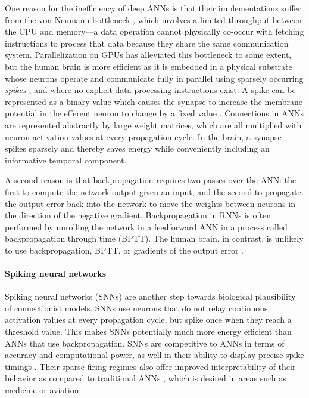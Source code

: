 	One reason for the inefficiency of deep ANNs is that their implementations suffer from the von Neumann bottleneck \citep{zenke2021brain}, which involves a limited throughput between the CPU and memory---a data operation cannot physically co-occur with fetching instructions to process that data because they share the same communication system.
	Parallelization on GPUs has alleviated this bottleneck to some extent, but the human brain is more efficient as it is embedded in a physical substrate whose neurons operate and communicate fully in parallel \citep{a2017parallel} using sparsely occurring \emph{spikes} \citep{bear2020neuroscience}, and where no explicit data processing instructions exist.
	A spike can be represented as a binary value which causes the synapse to increase the membrane potential in the efferent neuron to change by a fixed value \citep{bear2020neuroscience}.
	Connections in ANNs are represented abstractly by large weight matrices, which are all multiplied with neuron activation values at every propagation cycle.
	In the brain, a synapse spikes sparsely and thereby saves energy while conveniently including an informative temporal component.

	A second reason is that backpropagation requires two passes over the ANN: the first to compute the network output given an input, and the second to propagate the output error back into the network to move the weights between neurons in the direction of the negative gradient.
	Backpropagation in RNNs is often performed by unrolling the network in a feedforward ANN in a process called backpropagation through time (BPTT).
	The human brain, in contrast, is unlikely to use backpropagation, BPTT, or gradients of the output error \citep{lillicrap2019backpropagation}.

\paragraph{Spiking neural networks}
	Spiking neural networks (SNNs) \citep{maass1997networks,gerstner2002spiking} are another step towards biological plausibility of connectionist models.
	SNNs use neurons that do not relay continuous activation values at every propagation cycle, but spike once when they reach a threshold value.
	This makes SNNs potentially much more energy efficient than ANNs that use backpropagation.
	SNNs are competitive to ANNs in terms of accuracy and computational power, as well in their ability to display precise spike timings \citep{lobo2020spiking}.
	Their sparse firing regimes also offer improved interpretability of their behavior as compared to traditional ANNs \citep{soltic2010knowledge}, which is desired in areas such as medicine or aviation.

